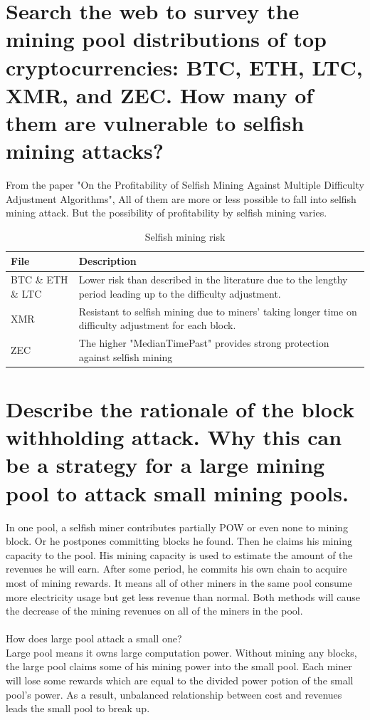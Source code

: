 \documentclass{article}
\begin{document}
\section{Search the web to survey the mining pool distributions of top cryptocurrencies:
BTC, ETH, LTC, XMR, and ZEC. How many of them are vulnerable to selfish mining
attacks?}
From the paper "On the Profitability of Selfish Mining Against
Multiple Difficulty Adjustment Algorithms",
All of them are more or less possible to fall into selfish mining attack.
But the possibility of profitability by selfish mining varies.
\begin{table}[h]
    \small
    \begin{threeparttable}
        \begin{tabular}{|p{4cm}|p{10cm}|}
        \hline
        \textbf{File} &	\textbf{Description} \\
        \hline
        BTC \& ETH \& LTC & Lower risk than described in 
        the literature due to  the lengthy period leading up to the difficulty
        adjustment.\\
        \hline
        XMR & Resistant to selfish mining due to miners' taking longer time 
        on difficulty adjustment
        for each block.\\
        \hline
        ZEC & The higher "MedianTimePast" provides 
        strong protection against selfish mining\\
        \hline
        \end{tabular}
    \end{threeparttable}
    \caption{Selfish mining risk}
    \label{table:smr}
\end{table}
\section{Describe the rationale of the block withholding attack. Why this can be a strategy
for a large mining pool to attack small mining pools.}
In one pool, a selfish miner contributes partially POW or even none to mining block. 
Or he postpones committing blocks he found. 
Then he claims his mining capacity to the pool.
His mining capacity is used to estimate the amount of the revenues he will earn.
After some period, he commits his own chain to acquire most of mining rewards.
It means all of other miners in the same pool consume more electricity usage 
but get less revenue than normal.
Both methods will cause the decrease of the mining revenues on all of the miners in the pool.\\\\
How does large pool attack a small one?\\
Large pool means it owns large computation power. Without mining any blocks, 
the large pool claims some of his mining power into the small pool.
Each miner will lose some rewards 
which are equal to the divided power potion of the small pool's power.
As a result, unbalanced relationship between cost and revenues leads the small pool to break up.
\end{document}
